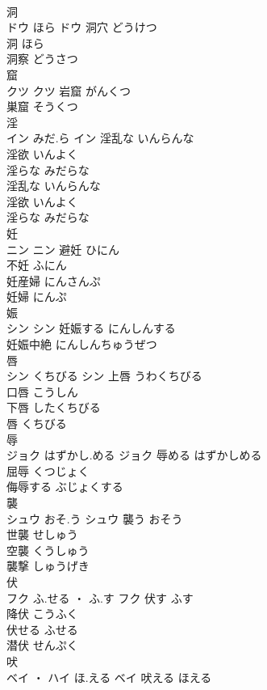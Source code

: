 \documentclass[8pt]{extreport}
\begin{document}
\begin{CJK}{UTF8}{min}
\\	洞	
\\	ドウ	ほら	ドウ	洞穴	どうけつ	
\\	洞	ほら	
\\	洞察	どうさつ	
\\	窟	
\\	クツ		クツ													岩窟	がんくつ	
\\	巣窟	そうくつ	
\\	淫	
\\	イン	みだ.ら	イン	淫乱な	いんらんな	
\\	淫欲	いんよく	
\\	淫らな	みだらな	
\\	淫乱な	いんらんな	
\\	淫欲	いんよく	
\\	淫らな	みだらな	
\\	妊	
\\	ニン		ニン	避妊	ひにん	
\\	不妊	ふにん	
\\	妊産婦	にんさんぷ	
\\	妊婦	にんぷ	
\\	娠	
\\	シン		シン	妊娠する	にんしんする	
\\	妊娠中絶	にんしんちゅうぜつ	
\\	唇	
\\	シン	くちびる	シン	上唇	うわくちびる	
\\	口唇	こうしん	
\\	下唇	したくちびる	
\\	唇	くちびる	
\\	辱	
\\	ジョク	はずかし.める	ジョク	辱める	はずかしめる	
\\	屈辱	くつじょく	
\\	侮辱する	ぶじょくする	
\\	襲	
\\	シュウ	おそ.う	シュウ	襲う	おそう	
\\	世襲	せしゅう	
\\	空襲	くうしゅう	
\\	襲撃	しゅうげき	
\\	伏	
\\	フク	ふ.せる ・ ふ.す	フク	伏す	ふす	
\\	降伏	こうふく	
\\	伏せる	ふせる	
\\	潜伏	せんぷく	
\\	吠	
\\	ベイ ・ ハイ	ほ.える	ベイ	吠える	ほえる	

\end{CJK}
\end{document}

